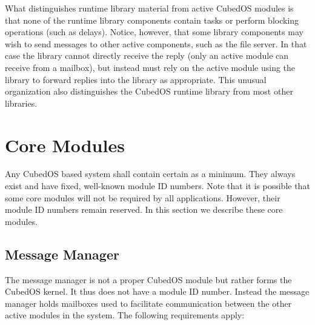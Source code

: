 What distinguishes runtime library material from active CubedOS modules is that none of the
runtime library components contain tasks or perform blocking operations (such as delays).
Notice, however, that some library components may wish to send messages to other active
components, such as the file server. In that case the library cannot directly receive the reply
(only an active module can receive from a mailbox), but instead must rely on the active module
using the library to forward replies into the library as appropriate. This unusual organization
also distinguishes the CubedOS runtime library from most other libraries.

\section{Core Modules}
\label{sec:core-modules}

Any CubedOS based system shall contain certain  as a minimum. They always
exist and have fixed, well-known module ID numbers. Note that it is possible that some core
modules will not be required by all applications. However, their module ID numbers remain
reserved. In this section we describe these core modules.

\subsection{Message Manager}
\label{sec:message-manager}

The message manager is not a proper CubedOS module but rather forms the CubedOS kernel. It thus
does not have a module ID number. Instead the message manager holds mailboxes used to facilitate
communication between the other active modules in the system. The following requirements apply:

